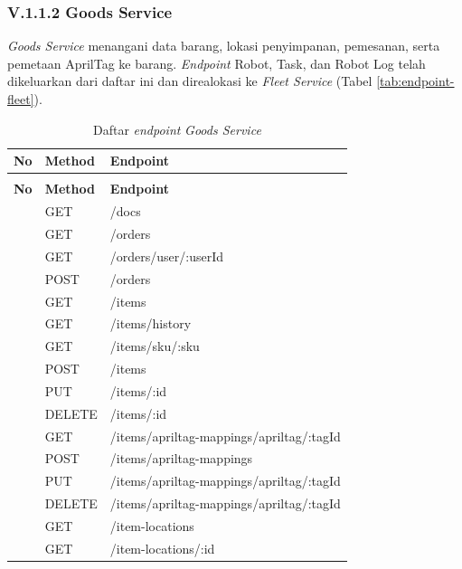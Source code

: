 \subsubsection*{V.1.1.2 Goods Service}
\textit{Goods Service} menangani data barang, lokasi penyimpanan, pemesanan, serta pemetaan AprilTag ke barang. \textit{Endpoint} Robot, Task, dan Robot Log telah dikeluarkan dari daftar ini dan direalokasi ke \textit{Fleet Service} (Tabel \ref{tab:endpoint-fleet}).

\begin{xltabular}{\textwidth}{ | >{\raggedright\arraybackslash}p{1cm} | >{\raggedright\arraybackslash}p{2cm} | >{\raggedright\arraybackslash}X | }
    \caption{Daftar \textit{endpoint} \textit{Goods Service}} \label{tab:endpoint-goods} \\
    \hline
    \textbf{No} & \textbf{Method} & \textbf{Endpoint} \\
    \hline
    \endfirsthead
     \\
    \hline
    \textbf{No} & \textbf{Method} & \textbf{Endpoint} \\
    \hline
    \endhead
    \hline
     & GET & /docs \\
     & GET & /orders \\
     & GET & /orders/user/:userId \\
     & POST & /orders \\
     & GET & /items \\
     & GET & /items/history \\
     & GET & /items/sku/:sku \\
     & POST & /items \\
     & PUT & /items/:id \\
     & DELETE & /items/:id \\
     & GET & /items/apriltag-mappings/apriltag/:tagId \\
     & POST & /items/apriltag-mappings \\
     & PUT & /items/apriltag-mappings/apriltag/:tagId \\
     & DELETE & /items/apriltag-mappings/apriltag/:tagId \\
     & GET & /item-locations \\
     & GET & /item-locations/:id \\

\end{xltabular}
